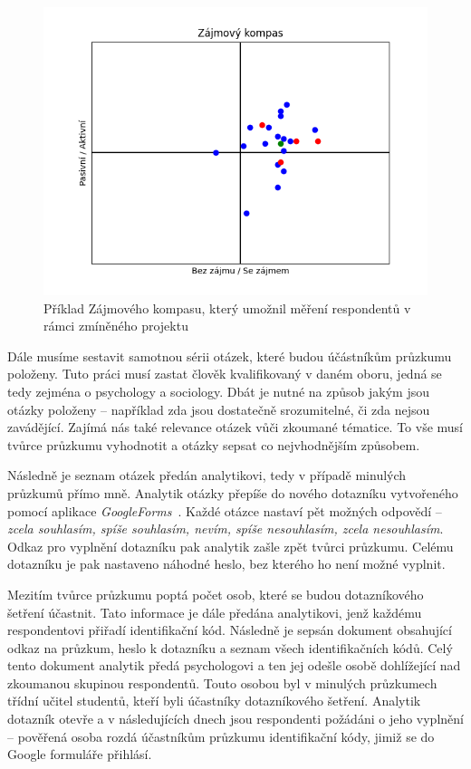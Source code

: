 \begin{figure}[h!]
    \centering
    \includegraphics[width=\textwidth]{images/zajmovykompas.png}
    \caption{Příklad Zájmového kompasu, který umožnil měření respondentů v rámci zmíněného projektu}
    \label{fig:zajmovykompas}
\end{figure}

Dále musíme sestavit samotnou sérii otázek, které budou účástníkům průzkumu položeny. Tuto práci musí zastat člověk kvalifikovaný v daném oboru, jedná se tedy zejména o psychology a sociology. Dbát je nutné na způsob jakým jsou otázky položeny – například zda jsou dostatečně srozumitelné, či zda nejsou zavádějící. Zajímá nás také relevance otázek vůči zkoumané tématice. To vše musí tvůrce průzkumu vyhodnotit a otázky sepsat co nejvhodnějším způsobem.

Následně je seznam otázek předán analytikovi, tedy v případě minulých průzkumů přímo mně. Analytik otázky přepíše do nového dotazníku vytvořeného pomocí aplikace \textit{GoogleForms}~\cite{googleforms}. Každé otázce nastaví pět možných odpovědí – \textit{zcela souhlasím, spíše souhlasím, nevím, spíše nesouhlasím, zcela nesouhlasím}. Odkaz pro vyplnění dotazníku pak analytik zašle zpět tvůrci průzkumu. Celému dotazníku je pak nastaveno náhodné heslo, bez kterého ho není možné vyplnit. 

Mezitím tvůrce průzkumu poptá počet osob, které se budou dotazníkového šetření účastnit. Tato informace je dále předána analytikovi, jenž každému respondentovi přiřadí identifikační kód. Následně je sepsán dokument obsahující odkaz na průzkum, heslo k dotazníku a seznam všech identifikačních kódů. Celý tento dokument analytik předá psychologovi a ten jej odešle osobě dohlížející nad zkoumanou skupinou respondentů. Touto osobou byl v minulých průzkumech třídní učitel studentů, kteří byli účastníky dotazníkového šetření. Analytik dotazník otevře a v následujících dnech jsou respondenti požádáni o jeho vyplnění – pověřená osoba rozdá účastníkům průzkumu identifikační kódy, jimiž se do Google formuláře přihlásí.

